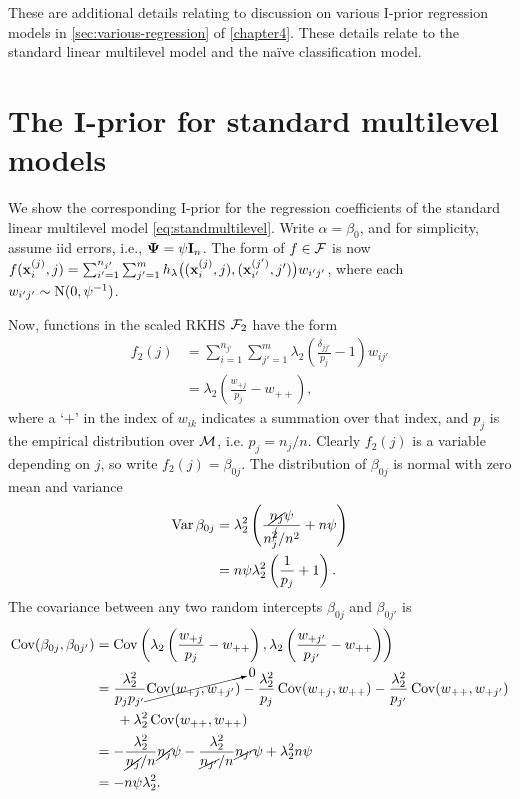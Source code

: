 These are additional details relating to discussion on various I-prior regression models in \cref{sec:various-regression} of \cref{chapter4}.
These details relate to the standard linear multilevel model and the naïve classification model.

\section{The I-prior for standard multilevel models}
\label{misc:multilevelmodels}

We show the corresponding I-prior for the regression coefficients of the standard linear multilevel model \cref{eq:standmultilevel}.
Write $\alpha=\beta_0$, and for simplicity, assume iid errors, i.e.,  ${\bm\Psi} = \psi{\mathbf I}_n$.
The form of $f\in{\mathcal F}$ is now $f({\mathbf x}_i^{(j)},j) = \sum_{i'=1}^{n_{j'}}\sum_{j'=1}^m h_\lambda\big(({\mathbf x}_i^{(j)},j),({\mathbf x}_{i'}^{(j')},j')\big) w_{i'j'}$, where each $w_{i'j'}\sim\operatorname{N}(0,\psi^{-1})$.

Now, functions in the scaled RKHS ${\mathcal F}_2$ have the form
\begin{align*}
  f_2(j) 
  &= \sum_{i=1}^{n_{j'}}\sum_{j'=1}^m \lambda_2\left( \frac{\delta_{jj'}}{p_j} - 1 \right)w_{ij'} \\
  &=  \lambda_2\left( \frac{w_{+j}}{p_j} - w_{++} \right),
\end{align*}
where a `$+$' in the index of $w_{ik}$ indicates a summation over that index, and $p_j$ is the empirical distribution over ${\mathcal M}$, i.e. $p_j = n_j/n$.
Clearly $f_2(j)$ is a variable depending on $j$, so write $f_2(j)=\beta_{0j}$.
The distribution of $\beta_{0j}$ is normal with zero mean and variance
\begin{align*}
  \operatorname{Var} \beta_{0j} 
  &= \lambda_2^2 \left( \frac{\cancel{n_j}\psi}{n_j^{\cancel{2}} / n^2} + n\psi \right)  \\
  &= n\psi\lambda_2^2 \left( \frac{1}{p_j} + 1 \right).
\end{align*}
The covariance between any two random intercepts $\beta_{0j}$ and $\beta_{0j'}$ is
\begin{align*}
  \operatorname{Cov}(\beta_{0j},\beta_{0j'})
  &= \operatorname{Cov}\left( \lambda_2\left( \frac{w_{+j}}{p_j} - w_{++} \right), \lambda_2\left( \frac{w_{+j'}}{p_{j'}} - w_{++} \right) \right)  \\
  &= \frac{\lambda_2^2}{p_j p_{j'}} \cancelto{0}{\operatorname{Cov}(w_{+j},w_{+j'})} - \frac{\lambda_2^2}{p_j} \operatorname{Cov}(w_{+j},w_{++}) - \frac{\lambda_2^2}{p_{j'}} \operatorname{Cov}(w_{++},w_{+j'}) \\
  &\phantom{==} + \lambda_2^2 \operatorname{Cov}(w_{++},w_{++}) \\
  &= - \frac{\lambda_2^2}{\cancel{n_j}/n} \cancel{n_j}\psi - \frac{\lambda_2^2}{\cancel{n_{j'}}/n} \cancel{n_{j'}}\psi + \lambda_2^2 n\psi \\
  &= -n\psi\lambda_2^2.
\end{align*}

